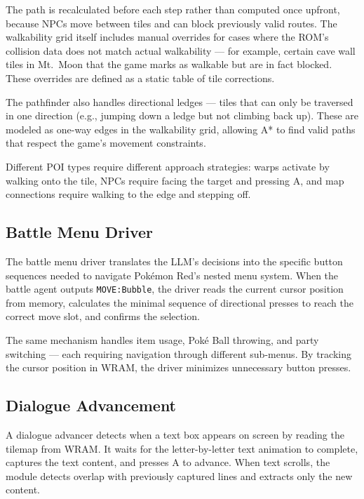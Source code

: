 \documentclass{article}
\begin{document}
The path is recalculated before each step rather than computed once upfront, because NPCs move between tiles and can block previously valid routes. The walkability grid itself includes manual overrides for cases where the ROM's collision data does not match actual walkability --- for example, certain cave wall tiles in Mt.\ Moon that the game marks as walkable but are in fact blocked. These overrides are defined as a static table of tile corrections.

The pathfinder also handles directional ledges --- tiles that can only be traversed in one direction (e.g., jumping down a ledge but not climbing back up). These are modeled as one-way edges in the walkability grid, allowing A* to find valid paths that respect the game's movement constraints.

Different POI types require different approach strategies: warps activate by walking onto the tile, NPCs require facing the target and pressing A, and map connections require walking to the edge and stepping off.

\subsection{Battle Menu Driver}

The battle menu driver translates the LLM's decisions into the specific button sequences needed to navigate Pok\'{e}mon Red's nested menu system. When the battle agent outputs \texttt{MOVE:Bubble}, the driver reads the current cursor position from memory, calculates the minimal sequence of directional presses to reach the correct move slot, and confirms the selection.

The same mechanism handles item usage, Pok\'{e} Ball throwing, and party switching --- each requiring navigation through different sub-menus. By tracking the cursor position in WRAM, the driver minimizes unnecessary button presses.

\subsection{Dialogue Advancement}

A dialogue advancer detects when a text box appears on screen by reading the tilemap from WRAM. It waits for the letter-by-letter text animation to complete, captures the text content, and presses A to advance. When text scrolls, the module detects overlap with previously captured lines and extracts only the new content.
\end{document}
